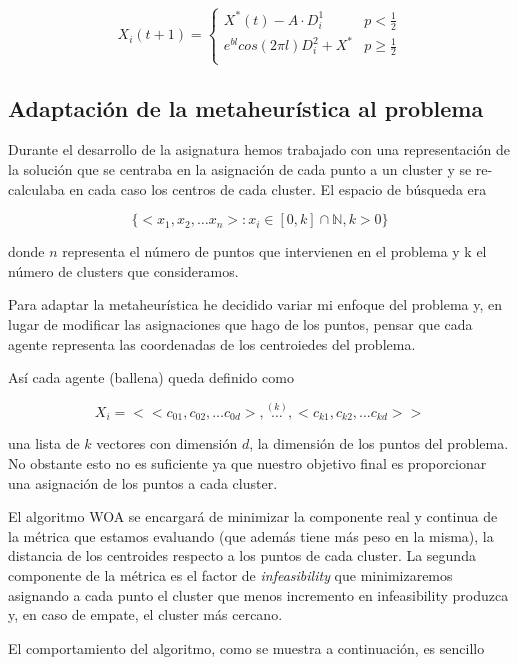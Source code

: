 \documentclass[11pt]{article}
\begin{document}
\[
    X_i(t+1) =  
\begin{cases}
    X^*(t) - A\cdot D^1_i & p < \frac{1}{2}\\
    e^{bl}cos(2\pi l)D^2_i + X^*  & p\geq \frac{1}{2}\\  
\end{cases}
\]

\subsection{Adaptación de la metaheurística al problema}

Durante el desarrollo de la asignatura hemos trabajado con una representación
de la solución que se centraba en la asignación de cada punto a un cluster
y se re-calculaba en cada caso los centros de cada cluster. El espacio de búsqueda 
era 

\[
    \{<x_1, x_2, \dots x_n >: x_i \in [0, k] \cap \mathbb{N}, k > 0\}
\]

donde $n$ representa el número de puntos que intervienen en el problema y k el número 
de clusters que consideramos.

Para adaptar la metaheurística he decidido variar mi enfoque del problema y, en
lugar de modificar las asignaciones que hago de los puntos, pensar que cada
agente representa las coordenadas de los centroiedes del problema.

Así cada agente (ballena) queda definido como 

\[
    X_i = <<c_{01},c_{02}, \dots c_{0d}>, \overset{(k)}{\dots}, <c_{k1},c_{k2},\dots c_{kd}>>    
\]

una lista de $k$ vectores con dimensión $d$, la dimensión de los puntos del
problema. No obstante esto no es suficiente ya que nuestro objetivo final es 
proporcionar una asignación de los puntos a cada cluster. 

El algoritmo WOA se encargará de minimizar la componente real y continua de la
métrica que estamos evaluando (que además tiene más peso en la misma), la
distancia de los centroides respecto a los puntos de cada cluster. La segunda
componente de la métrica es el factor de \textit{infeasibility} que
minimizaremos asignando a cada punto el cluster que menos incremento en
infeasibility produzca y, en caso de empate, el cluster más cercano.

El comportamiento del algoritmo, como se muestra a continuación, es sencillo 
\end{document}
